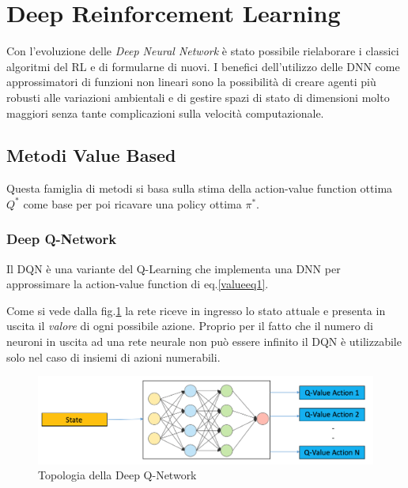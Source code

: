 \clearpage

\section{Deep Reinforcement Learning}

Con l'evoluzione delle \textit{Deep Neural Network} è stato possibile rielaborare i classici algoritmi del RL e di formularne di nuovi. I benefici dell'utilizzo delle DNN come approssimatori di funzioni non lineari sono la possibilità di creare agenti più robusti alle variazioni ambientali e di gestire spazi di stato di dimensioni molto maggiori senza tante complicazioni sulla velocità computazionale.

\subsection{Metodi Value Based}

Questa famiglia di metodi si basa sulla stima della action-value function ottima $Q^*$ come base per poi ricavare una policy ottima $\pi^*$.

\subsubsection{Deep Q-Network}

Il DQN\cite{dqnPaper} è una variante del Q-Learning che implementa una DNN per approssimare la action-value function di eq.\ref{valueeq1}.
\newline

Come si vede dalla fig.\ref{fig:dqnnetwork} la rete riceve in ingresso lo stato attuale e presenta in uscita il \textit{valore} di ogni possibile azione.
Proprio per il fatto che il numero di neuroni in uscita ad una rete neurale non può essere infinito il DQN è utilizzabile solo nel caso di insiemi di azioni numerabili.

\begin{figure}[hb]
    \centering
    \includegraphics[width = 5.5in]{Figures/Chapter2/dqn.png}
    \caption{Topologia della Deep Q-Network}
    \label{fig:dqnnetwork}
\end{figure}

